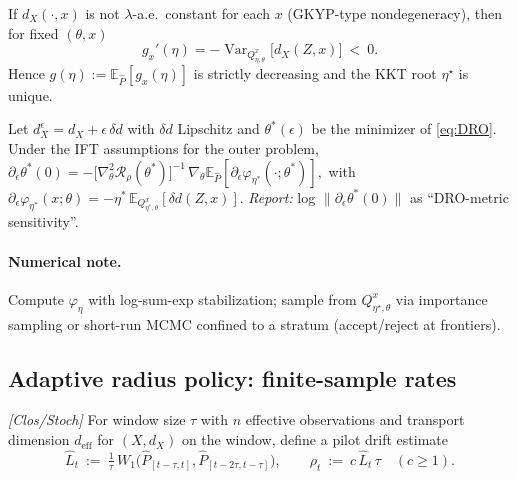 \begin{lemma}\label{lem:gprime}
If $d_X(\cdot,x)$ is not $\lambda$-a.e.\ constant for each $x$ (GKYP-type nondegeneracy), then for fixed $(\theta,x)$
\[
g_x'(\eta)=-\operatorname{Var}_{Q^{x}_{\eta,\theta}}\!\big[d_X(Z,x)\big]\ <\ 0.
\]
Hence $g(\eta):=\mathbb E_{\hat P}[g_x(\eta)]$ is strictly decreasing and the KKT root $\eta^\star$ is unique.
\end{lemma}

\begin{proposition}\label{prop:dro-metric-sens}
Let $d_X^\epsilon=d_X+\epsilon\,\delta d$ with $\delta d$ Lipschitz and $\theta^*(\epsilon)$ be the minimizer of \eqref{eq:DRO}. 
Under the IFT assumptions for the outer problem,
\(
\partial_\epsilon \theta^*(0)= - \big[\nabla^2_\theta \mathcal R_\rho(\theta^*)\big]^{-1}\,\nabla_{\theta}\mathbb E_{\hat P}\!\left[\partial_\epsilon \varphi_{\eta^*}(\cdot;\theta^*)\right],
\)
with $\partial_\epsilon \varphi_{\eta^*}(x;\theta)=-\eta^*\,\mathbb E_{Q^{x}_{\eta^*,\theta}}[\delta d(Z,x)]$. 
\emph{Report:} log $\|\partial_\epsilon\theta^*(0)\|$ as ``DRO-metric sensitivity''.
\end{proposition}

\paragraph{Numerical note.}
Compute $\varphi_\eta$ with log-sum-exp stabilization; sample from $Q_{\eta^\star,\theta}^x$ via importance sampling or short-run MCMC confined to a stratum (accept/reject at frontiers).

\subsection{Adaptive radius policy: finite-sample rates}\label{subsec:adaptive}

\begin{definition}\label{def:adaptive}
\emph{[\textup{Clos/Stoch}]} For window size $\tau$ with $n$ effective observations and transport dimension $d_{\mathrm{eff}}$ for $(X,d_X)$ on the window, define a pilot drift estimate
\[
\hat L_t\ :=\ \tfrac{1}{\tau}\,W_1\!\big(\hat P_{[t-\tau,t]},\hat P_{[t-2\tau,t-\tau]}\big),\qquad
\rho_t\ :=\ c\,\hat L_t\,\tau\quad (c\ge 1).
\]
\end{definition}

